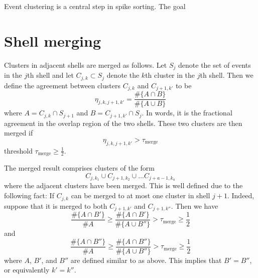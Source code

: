 \documentclass{article}
\begin{document}
Event clustering is a central step in spike sorting. The goal

\section{Shell merging}

Clusters in adjacent shells are merged as follows. Let $S_j$ denote the set of events in the $j$th shell and let $C_{j,k}\subset S_j$ denote the $k$th cluster in the $j$th shell. Then we define the agreement between clusters $C_{j,k}$ and $C_{j+1,k'}$ to be
$$\eta_{j,k,j+1,k'}=\frac{\#\{A\cap B\}}{\#\{A\cup B\}}$$ where
$A=C_{j,k}\cap S_{j+1}$ and $B=C_{j+1,k'}\cap S_j$. In words, it is the fractional agreement in the overlap region of the two shells. These two clusters are then merged if 
$$\eta_{j,k,j+1,k'}>\tau_{\text{merge}}$$  threshold $\tau_{\text{merge}}\geq \frac{1}{2}$.

The merged result comprises clusters of the form
$$C_{j,k_1}\cup C_{j+1,k_2}\cup\dots C_{j+a-1,k_a}$$
where the adjacent clusters have been merged. This is well defined due to the following fact: If $C_{j,k}$ can be merged to at most one cluster in shell $j+1$. Indeed, suppose that it is merged to both $C_{j+1,k'}$ and $C_{j+1,k''}$. Then we have
$$\frac{\#\{A\cap B'\}}{\#A}\geq\frac{\#\{A\cap B'\}}{\#\{A\cup B''\}}>\tau_{\text{merge}}\geq\frac{1}{2}$$
and
$$\frac{\#\{A\cap B''\}}{\#A}\geq\frac{\#\{A\cap B''\}}{\#\{A\cup B''\}}>\tau_{\text{merge}}\geq\frac{1}{2}$$
where $A$, $B'$, and $B''$ are defined similar to as above. This implies that $B'=B''$, or equivalently $k'=k''$.
\end{document}
